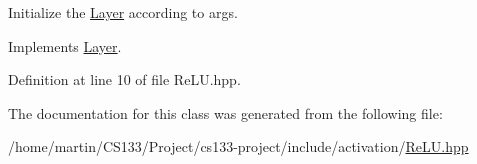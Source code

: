 Initialize the \hyperlink{class_layer}{Layer} according to args. 



Implements \hyperlink{class_layer_aab662b9c8e61cd7375cbb4413d2e3037}{Layer}.



Definition at line 10 of file Re\+L\+U.\+hpp.



The documentation for this class was generated from the following file\+:\begin{DoxyCompactItemize}
\item 
/home/martin/\+C\+S133/\+Project/cs133-\/project/include/activation/\hyperlink{re_l_u_8hpp}{Re\+L\+U.\+hpp}\end{DoxyCompactItemize}
